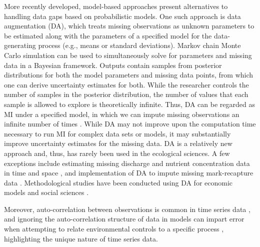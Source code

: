 More recently developed, model-based approaches present alternatives to handling data gaps based on probabilistic models. One such approach is data augmentation (DA), which treats missing observations as unknown parameters to be estimated along with the parameters of a specified model for the data-generating process (e.g., means or standard deviations). Markov chain Monte Carlo simulation can be used to simultaneously solve for parameters and missing data in a Bayesian framework. Outputs contain samples from posterior distributions for both the model parameters and missing data points, from which one can derive uncertainty estimates for both. While the researcher controls the number of samples in the posterior distribution, the number of values that each sample is allowed to explore is theoretically infinite. Thus, DA can be regarded as MI under a specified model, in which we can impute missing observations an infinite number of times \citep{kong_sequential_1994}. While DA may not improve upon the computation time necessary to run MI for complex data sets or models, it may substantially improve uncertainty estimates for the missing data. DA is a relatively new approach and, thus, has rarely been used in the ecological sciences. A few exceptions include estimating missing discharge and nutrient concentration data in time and space \citep{worrall_dissolved_2020}, and implementation of DA to impute missing mark-recapture data \citep{colchero_basta_2012, clark_hierarchical_2005}. Methodological studies have been conducted using DA for economic models \citep{bertschinger_bayesian_2021} and social sciences \citep{jackman_estimation_2000, honaker_what_2010}. 

Moreover, auto-correlation between observations is common in time series data \citep{lichstein_spatial_2002, dale_spatial_2002}, and ignoring the auto-correlation structure of data in models can impart error when attempting to relate environmental controls to a specific process \citep{fieberg_understanding_2012}, highlighting the unique nature of time series data.